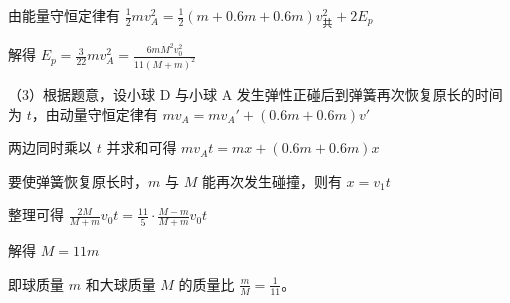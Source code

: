 \documentclass[\gkver]{gaokaozhenti}
\begin{document}
\begin{enumerate}
{由能量守恒定律有 $\frac{1}{2}mv_{A}^{2}=\frac{1}{2}\left(m+0.6m+0.6m\right)v_{\text{共}}^{2}+2E_{p}$

解得 $E_{p}=\frac{3}{22}mv_{A}^{2}=\frac{6mM^{2}v_{0}^{2}}{11(M+m)^{2}}$

（3）根据题意，设小球 D 与小球 A 发生弹性正碰后到弹簧再次恢复原长的时间为 $t$，由动量守恒定律有 $mv_{A} = mv_{A}' + \left(0.6m + 0.6m\right)v'$

两边同时乘以 $t$ 并求和可得 $mv_{A}t = mx + \left(0.6m + 0.6m\right)x$

要使弹簧恢复原长时，$m$ 与 $M$ 能再次发生碰撞，则有 $x = v_{1}t$

整理可得 $\frac{2M}{M+m}v_{0}t=\frac{11}{5}\cdot\frac{M-m}{M+m}v_{0}t$

解得 $M = 11m$

即球质量 $m$ 和大球质量 $M$ 的质量比 $\frac{m}{M} = \frac{1}{11}$。
}

\end{enumerate}
\end{document}
